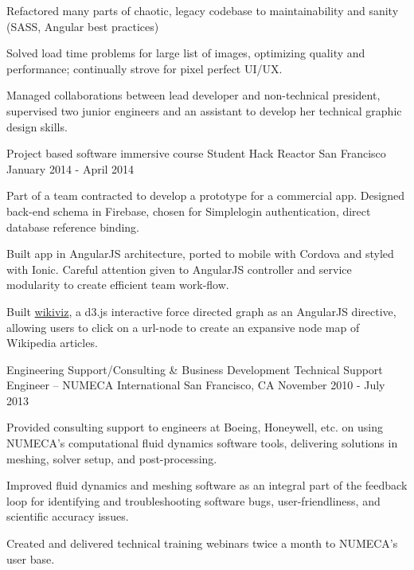 \begin{cventries}
{\begin{cvitems}
        \item {Refactored many parts of chaotic, legacy codebase to maintainability and sanity (SASS, Angular best practices)
        \item Solved load time problems for large list of images, optimizing quality and performance; continually strove for pixel perfect UI/UX.}
        \item {Managed collaborations between lead developer and non-technical president, supervised two junior engineers and an assistant to develop her technical graphic design skills.}
      \end{cvitems}
    }
  \cventry
    {Project based software immersive course}
    {Student{\enskip\cdotp\enskip} Hack Reactor}
    {San Francisco}
    {January 2014 - April 2014}
    {
      \begin{cvitems}
        \item {Part of a team contracted to develop a prototype for a commercial app. Designed back-end schema in Firebase, chosen for Simplelogin authentication, direct database reference binding.}
        \item {Built app in AngularJS architecture, ported to mobile with Cordova and styled with Ionic. Careful attention given to AngularJS controller and service modularity to create efficient team work-flow.}
        \item {Built \href{http://wikiviz.herokuapp.com}{wikiviz}, a d3.js interactive force directed graph as an AngularJS directive, allowing users to click on a url-node to create an expansive node map of Wikipedia articles.}
      \end{cvitems} 
    }
  \cventry
    {Engineering Support/Consulting \& Business Development}
    {Technical Support Engineer – NUMECA International}
    {San Francisco, CA}
    {November 2010 - July 2013}
    {
      \begin{cvitems}
        \item {Provided consulting support to engineers at Boeing, Honeywell, etc. on using NUMECA’s computational fluid dynamics software tools, delivering solutions in meshing, solver setup, and post-processing.}
        \item {Improved fluid dynamics and meshing software as an integral part of the feedback loop for identifying and troubleshooting software bugs, user-friendliness, and scientific accuracy issues.}
        \item Created and delivered technical training webinars twice a month to NUMECA’s user base.
      \end{cvitems}
}
\end{cventries}
